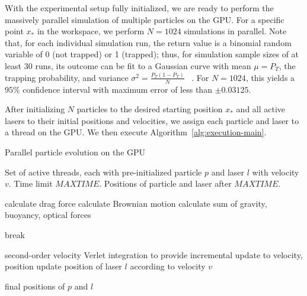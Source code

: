 %

With the experimental setup fully initialized, we are ready to perform
the massively parallel simulation of multiple particles on the GPU.
For a specific point $x_*$ in the workspace, we perform $N = 1024$
simulations in parallel.  Note that, for each individual simulation
run, the return value is a binomial random variable of 0 (not trapped)
or 1 (trapped); thus, for simulation sample sizes of at least $30$
runs, its outcome can be fit to a Gaussian curve with mean $\mu =
P_T$, the trapping probability, and variance $\sigma^2 = \frac{P_T (1
  - P_T)}{N}$ ~\cite{Hines:2003}.  For $N = 1024$, this yields a $95\%$ confidence
interval with maximum error of less than $\pm 0.03125$.


After initializing $N$ particles to the desired starting position 
$x_*$ and all active lasers to their initial positions and velocities, 
we assign each particle and laser to a thread on the GPU.  
We then execute Algorithm~\ref{alg:execution-main}.

\begin{algorithm}[t]
\caption{Parallel particle evolution on the GPU}
\label{alg:execution-main}

\begin{algorithmic}[1]
 \REQUIRE Set of active threads, each with pre-initialized particle $p$ and laser $l$ with velocity $v$. Time limit
$\textit{MAXTIME}$.
 \ENSURE Positions of particle and laser after $\textit{MAXTIME}$.

    \STATE calculate drag force\;
    \STATE calculate Brownian motion\;
    \STATE calculate sum of gravity, buoyancy, optical forces\;

      \STATE break\;
    \ENDIF

    \STATE second-order velocity Verlet integration to provide incremental update to velocity, position\;
    \STATE update position of laser $l$ according to velocity $v$\;
  \ENDWHILE

  \RETURN final positions of $p$ and $l$\;
\ENDFOR

\end{algorithmic}
\end{algorithm}

